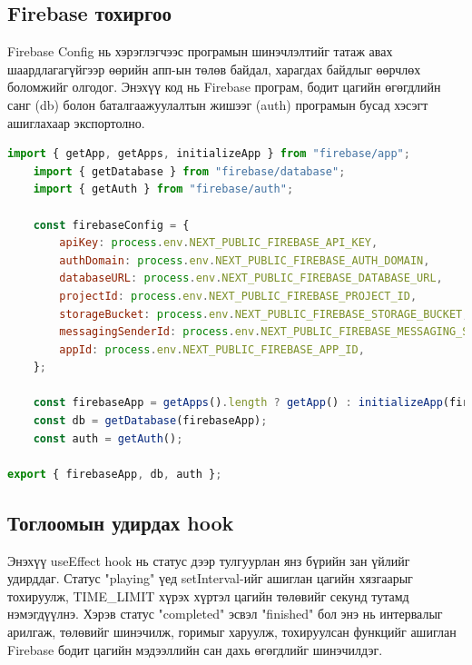 \subsection{Firebase тохиргоо}

Firebase Config нь хэрэглэгчээс програмын шинэчлэлтийг татаж авах шаардлагагүйгээр өөрийн апп-ын төлөв байдал, харагдах байдлыг өөрчлөх боломжийг олгодог.
Энэхүү код нь Firebase програм, бодит цагийн өгөгдлийн санг (db) болон баталгаажуулалтын жишээг (auth) програмын бусад хэсэгт ашиглахаар экспортолно.

\begin{lstlisting}[language=Javascript, caption=Firebase config, frame=single]
	import { getApp, getApps, initializeApp } from "firebase/app";
	import { getDatabase } from "firebase/database";
	import { getAuth } from "firebase/auth";

	const firebaseConfig = {
		apiKey: process.env.NEXT_PUBLIC_FIREBASE_API_KEY,
		authDomain: process.env.NEXT_PUBLIC_FIREBASE_AUTH_DOMAIN,
		databaseURL: process.env.NEXT_PUBLIC_FIREBASE_DATABASE_URL,
		projectId: process.env.NEXT_PUBLIC_FIREBASE_PROJECT_ID,
		storageBucket: process.env.NEXT_PUBLIC_FIREBASE_STORAGE_BUCKET,
		messagingSenderId: process.env.NEXT_PUBLIC_FIREBASE_MESSAGING_SENDER_ID,
		appId: process.env.NEXT_PUBLIC_FIREBASE_APP_ID,
	};

	const firebaseApp = getApps().length ? getApp() : initializeApp(firebaseConfig);
	const db = getDatabase(firebaseApp);
	const auth = getAuth();

export { firebaseApp, db, auth };

\end{lstlisting}

\subsection{Тоглоомын удирдах hook}

Энэхүү useEffect hook нь статус дээр тулгуурлан янз бүрийн зан үйлийг удирддаг. Статус "playing" үед setInterval-ийг ашиглан цагийн хязгаарыг тохируулж, TIME\_LIMIT хүрэх хүртэл цагийн төлөвийг секунд тутамд нэмэгдүүлнэ. Хэрэв статус "completed" эсвэл "finished" бол энэ нь интервалыг арилгаж, төлөвийг шинэчилж, горимыг харуулж, тохируулсан функцийг ашиглан Firebase бодит цагийн мэдээллийн сан дахь өгөгдлийг шинэчилдэг.

